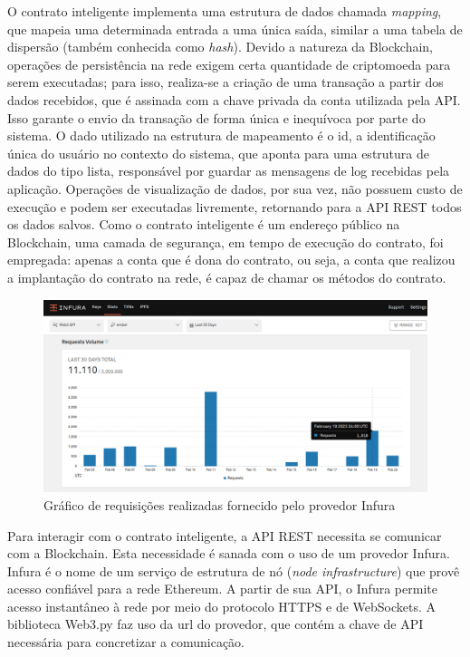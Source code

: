 O contrato inteligente implementa uma estrutura de dados chamada \emph{mapping}, que mapeia uma determinada entrada a uma única saída, similar a uma tabela de dispersão (também conhecida como \emph{hash}). Devido a natureza da Blockchain, operações de persistência na rede exigem certa quantidade de criptomoeda para serem executadas; para isso, realiza-se a criação de uma transação a partir dos dados recebidos, que é assinada com a chave privada da conta utilizada pela API. Isso garante o envio da transação de forma única e inequívoca por parte do sistema. O dado utilizado na estrutura de mapeamento é o id, a identificação única do usuário no contexto do sistema, que aponta para uma estrutura de dados do tipo lista, responsável por guardar as mensagens de log recebidas pela aplicação. Operações de visualização de dados, por sua vez, não possuem custo de execução e podem ser executadas livremente, retornando para a API REST todos os dados salvos. Como o contrato inteligente é um endereço público na Blockchain, uma camada de segurança, em tempo de execução do contrato, foi empregada: apenas a conta que é dona do contrato, ou seja, a conta que realizou a implantação do contrato na rede, é capaz de chamar os métodos do contrato.

\begin{figure}
    \centering
    \includegraphics[width=1\textwidth]{img/Cap3/blockchain/Infura estatisticas.png}
    \caption{Gráfico de requisições realizadas fornecido pelo provedor Infura}
    \label{fig:infura_estatisticas}
\end{figure}
Para interagir com o contrato inteligente, a API REST necessita se comunicar com a Blockchain. Esta necessidade é sanada com o uso de um provedor Infura. Infura é o nome de um serviço de estrutura de nó (\emph{node infrastructure}) que provê acesso confiável para a rede Ethereum. A partir de sua API, o Infura permite acesso instantâneo à rede por meio do protocolo HTTPS e de WebSockets. A biblioteca Web3.py faz uso da url do provedor, que contém a chave de API necessária para concretizar a comunicação.

